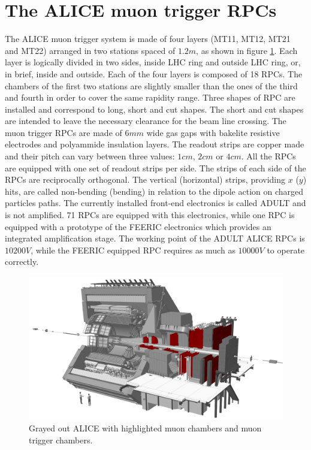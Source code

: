 \section{The ALICE muon trigger RPCs}
The ALICE muon trigger system is made of four layers (MT11, MT12, MT21 and MT22) arranged in two stations spaced of $1.2m$, as shown in figure \ref{fig:ALICEmuon}.
Each layer is logically divided in two sides, inside LHC ring and outside LHC ring, or, in brief, inside and outside.
Each of the four layers is composed of 18 RPCs.
The chambers of the first two stations are slightly smaller than the ones of the third and fourth in order to cover the same rapidity range.
Three shapes of RPC are installed and correspond to long, short and cut shapes.
The short and cut shapes are intended to leave the necessary clearance for the beam line crossing.
The muon trigger RPCs are made of $6mm$ wide gas gaps with bakelite resistive electrodes and polyammide insulation layers.
The readout strips are copper made and their pitch can vary between three values: $1cm$, $2cm$ or $4cm$.
All the RPCs are equipped with one set of readout strips per side.
The strips of each side of the RPCs are reciprocally orthogonal.
The vertical (horizontal) strips, providing $x$ ($y$) hits, are called non-bending (bending) in relation to the dipole action on charged particles paths.
The currently installed front-end electronics is called ADULT and is not amplified.
71 RPCs are equipped with this electronics, while one RPC is equipped with a prototype of the FEERIC electronics which provides an integrated amplification stage.
The working point of the ADULT ALICE RPCs is $10200V$, while the FEERIC equipped RPC requires as much as $10000V$ to operate correctly.

\begin{figure}[!t]
\begin{center}
\includegraphics[width=\linewidth]{Chapters/Performance/Figs/ALICEmuon.png}
\caption{Grayed out ALICE with highlighted muon chambers and muon trigger chambers.}
\label{fig:ALICEmuon}
\end{center}
\end{figure}

